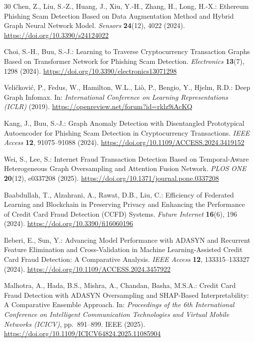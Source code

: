 \documentclass[12pt,a4paper]{article}
\begin{document}
\begin{thebibliography}{30}
  Chen, Z., Liu, S.-Z., Huang, J., Xiu, Y.-H., Zhang, H.,
  Long, H.-X.:
  Ethereum Phishing Scam Detection Based on Data
  Augmentation Method and Hybrid Graph Neural Network
  Model.
  \textit{Sensors} \textbf{24}(12), 4022 (2024).
  \url{https://doi.org/10.3390/s24124022}

  Choi, S.-H., Buu, S.-J.:
  Learning to Traverse Cryptocurrency Transaction Graphs
  Based on Transformer Network for Phishing Scam
  Detection.
  \textit{Electronics} \textbf{13}(7), 1298 (2024).
  \url{https://doi.org/10.3390/electronics13071298}

  Veli\v{c}kovi\'{c}, P., Fedus, W., Hamilton, W.L.,
  Li\`{o}, P., Bengio, Y., Hjelm, R.D.:
  Deep Graph Infomax.
  In: \textit{International Conference on Learning
  Representations (ICLR)} (2019).
  \url{https://openreview.net/forum?id=rklz9iAcKQ}

  Kang, J., Buu, S.-J.:
  Graph Anomaly Detection with Disentangled Prototypical
  Autoencoder for Phishing Scam Detection in
  Cryptocurrency Transactions.
  \textit{IEEE Access} \textbf{12}, 91075--91088 (2024).
  \url{https://doi.org/10.1109/ACCESS.2024.3419152}

  Wei, S., Lee, S.:
  Internet Fraud Transaction Detection Based on
  Temporal-Aware Heterogeneous Graph Oversampling and
  Attention Fusion Network.
  \textit{PLOS ONE} \textbf{20}(12), e0337208 (2025).
  \url{https://doi.org/10.1371/journal.pone.0337208}

  Baabdullah, T., Alzahrani, A., Rawat, D.B., Liu, C.:
  Efficiency of Federated Learning and Blockchain in
  Preserving Privacy and Enhancing the Performance of
  Credit Card Fraud Detection (CCFD) Systems.
  \textit{Future Internet} \textbf{16}(6), 196 (2024).
  \url{https://doi.org/10.3390/fi16060196}

  Ileberi, E., Sun, Y.:
  Advancing Model Performance with ADASYN and Recurrent
  Feature Elimination and Cross-Validation in Machine
  Learning-Assisted Credit Card Fraud Detection:
  A Comparative Analysis.
  \textit{IEEE Access} \textbf{12}, 133315--133327 (2024).
  \url{https://doi.org/10.1109/ACCESS.2024.3457922}

  Malhotra, A., Hada, B.S., Mishra, A., Chandan,
  Basha, M.S.A.:
  Credit Card Fraud Detection with ADASYN Oversampling
  and SHAP-Based Interpretability: A Comparative
  Ensemble Approach.
  In: \textit{Proceedings of the 6th International
  Conference on Intelligent Communication Technologies
  and Virtual Mobile Networks (ICICV)}, pp.\ 891--899.
  IEEE (2025).
  \url{https://doi.org/10.1109/ICICV64824.2025.11085904}


\end{thebibliography}
\end{document}
